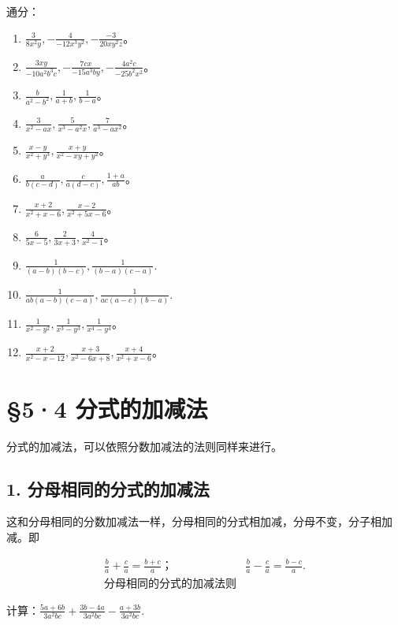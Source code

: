 通分：

\begin{enumerate}[start=1]
\item
  \(\frac{3}{8x^2y}, -\frac{4}{-12x^3y^2}, -\frac{-3}{20xy^2z}\)。
\item
  \(\frac{3xy}{-10a^2b^3c}, -\frac{7cx}{-15a^3by}, -\frac{4a^2c}{-25b^2x^2}\)。
\item
  \(\frac{b}{a^2 - b^2}, \frac{1}{a + b}, \frac{1}{b - a}\)。
\item
  \(\frac{3}{x^2 - ax}, \frac{5}{x^3 - a^2x}, \frac{7}{a^3 - ax^2}\)。
\item
  \(\frac{x - y}{x^2 + y^3}, \frac{x + y}{x^2 - xy + y^2}\)。
\item
  \(\frac{a}{b(c - d)}, \frac{c}{a(d - c)}, \frac{1 + a}{ab}\)。
\item
  \(\frac{x + 2}{x^2 + x - 6}, \frac{x - 2}{x^2 + 5x - 6}\)。
\item
  \(\frac{6}{5x - 5}, \frac{2}{3x + 3}, \frac{4}{x^2 - 1}\)。
\item
  \(\frac{1}{(a - b)(b - c)}, \frac{1}{(b - a)(c - a)}.\)
\item
  \(\frac{1}{ab(a - b)(c - a)}, \frac{1}{ac(a - c)(b - a)}.\)
\item
  \(\frac{1}{x^2 - y^2}, \frac{1}{x^3 - y^3}, \frac{1}{x^4 - y^4}\)。
\item
  \(\frac{x + 2}{x^2 - x - 12}, \frac{x + 3}{x^2 - 6x + 8}, \frac{x + 4}{x^2 + x - 6}\)。
\end{enumerate}

\section{§5·4 分式的加减法}

分式的加减法，可以依照分数加减法的法则同样来进行。

\subsection{1. 分母相同的分式的加减法}

这和分母相同的分数加减法一样，分母相同的分式相加减，分母不变，分子相加减。即

\[
\boxed { \begin{array}{cccc} \frac{b}{a} + \frac{c}{a} = \frac{b + c}{a}\text{；} & \frac{b}{a} - \frac{c}{a} = \frac{b - c}{a}. \\ \text{分母相同的分式的加减法则} \end{array} }
\]

计算：\(\frac{5a + 6b}{3a^2bc} +\frac{3b - 4a}{3a^2bc} -\frac{a + 3b}{3a^2bc}.\)

